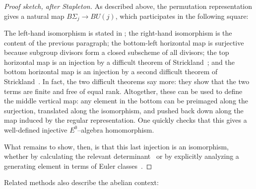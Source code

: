 \begin{proof}[Proof sketch, after Stapleton]
As described above, the permutation representation gives a natural map \(B\Sigma_j \to BU(j)\), which participates in the following square:
\begin{center}
\end{center}
The left-hand isomorphism is stated in ; the right-hand isomorphism is the content of the previous paragraph; the bottom-left horizontal map is surjective because subgroup divisors form a closed subscheme of all divisors; the top horizontal map is an injection by a difficult theorem of Strickland~\cite[Theorems 8.5--6]{StricklandEthyOfBSigma}; and the bottom horizontal map is an injection by a second difficult theorem of Strickland~\cite[Theorem 10.1]{StricklandFiniteSubgps}.  In fact, the two difficult theorems say more: they show that the two terms are finite and free of equal rank.  Altogether, these can be used to define the middle vertical map: any element in the bottom can be preimaged along the surjection, translated along the isomorphism, and pushed back down along the map induced by the regular representation.  One quickly checks that this gives a well-defined injective \(E^0\)--algebra homomorphism.

What remains to show, then, is that this last injection is an isomorphism, whether by calculating the relevant determinant~\cite[Section 7.9]{SchlankStapleton} or by explicitly analyzing a generating element in terms of Euler classes~\cite[Theorem 9.2]{StricklandEthyOfBSigma}.
\end{proof}

Related methods also describe the abelian context:


